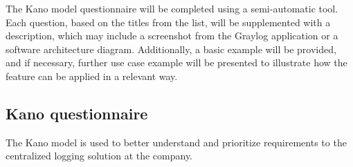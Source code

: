 \documentclass[../main.tex]{subfiles}
\begin{document}
The Kano model questionnaire will be completed using a semi-automatic tool. Each question, based on the titles from the list, will be supplemented with a description, which may include a screenshot from the Graylog application or a software architecture diagram. Additionally, a basic example will be provided, and if necessary, further use case example will be presented to illustrate how the feature can be applied in a relevant way.

\subsection{Kano questionnaire}

The Kano model is used to better understand and prioritize requirements to the centralized logging solution at the company. 
\end{document}
